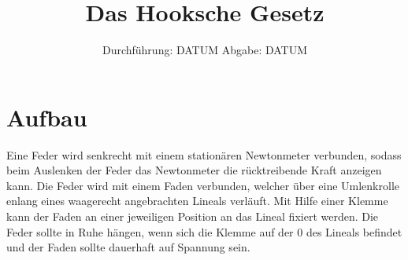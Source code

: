 

\subject{803}
\title{Das Hooksche Gesetz}
\date{%
  Durchführung: DATUM
  \hspace{3em}
  Abgabe: DATUM
}



\maketitle
\thispagestyle{empty}
\tableofcontents
\newpage



    \section{Aufbau}
    \label{sec:Aufbau}

    Eine Feder wird senkrecht mit einem stationären Newtonmeter verbunden, sodass beim Auslenken
    der Feder das Newtonmeter die rücktreibende Kraft anzeigen kann. Die Feder wird mit einem 
    Faden verbunden, welcher über eine Umlenkrolle enlang eines waagerecht angebrachten Lineals verläuft.
    Mit Hilfe einer Klemme kann der Faden an einer jeweiligen Position an das Lineal fixiert werden.
    Die Feder sollte in Ruhe hängen, wenn sich die Klemme auf der 0 des Lineals befindet und der Faden sollte 
    dauerhaft auf Spannung sein.





\printbibliography{}


